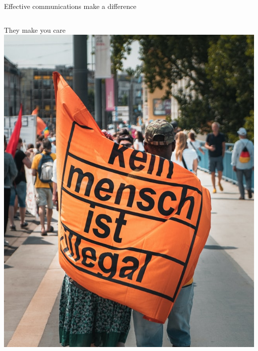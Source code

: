 \begin{frame}{Effective communications make a difference}
\begin{columns}
    \begin{column}{0.3\textwidth}
        \begin{block}{They make you care}
        \centering
            \includegraphics[width=\textwidth]{images/mika-baumeister-9fJidQI2o-s-unsplash.jpg}
        \end{block}
    \end{column}


\end{columns}
\end{frame}
